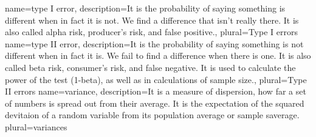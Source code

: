 {
    name={type I error},
    description={It is the probability of saying something is different when in fact it is not. We find a difference that isn’t really there. It is also called alpha risk, producer's risk, and false positive.},
    plural={Type I errors}
}
{
    name={type II error},
    description={It is the probability of saying something is not different when in fact it is. We fail to find a difference when there is one. It is also called beta risk, consumer’s risk, and false negative. It is used to calculate the power of the test (1-beta), as well as in calculations of sample size.},
    plural={Type II errors}
}
{
    name={variance},
    description={It is a measure of dispersion, how far a set of numbers is spread out from their average. It is the expectation of the squared devitaion of a random variable from its population average or sample saverage.}
    plural={variances}
}
